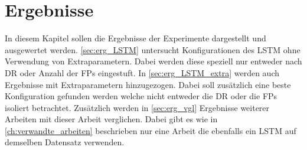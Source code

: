\chapter{Ergebnisse}\label{ch:erg}

In diesem Kapitel sollen die Ergebnisse der Experimente dargestellt und ausgewertet werden.
\autoref{sec:erg_LSTM} untersucht Konfigurationen des \ac{LSTM} ohne Verwendung von Extraparametern.
Dabei werden diese speziell nur entweder nach \ac{DR} oder Anzahl der \acp{FP} eingestuft.
In \autoref{sec:erg_LSTM_extra} werden auch Ergebnisse mit Extraparametern hinzugezogen.
Dabei soll zusätzlich eine beste Konfiguration gefunden werden welche nicht entweder die \ac{DR} oder die \acp{FP} isoliert betrachtet.
Zusätzlich werden in \autoref{sec:erg_vgl} Ergebnisse weiterer Arbeiten mit dieser Arbeit verglichen.
Dabei gibt es wie in \autoref{ch:verwandte_arbeiten} beschrieben nur eine Arbeit die ebenfalls ein \ac{LSTM} auf demselben Datensatz verwenden.

